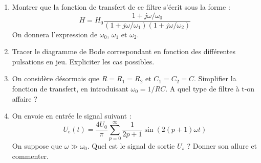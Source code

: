\begin{enumerate}

	\item Montrer que la fonction de transfert de ce filtre s'écrit sous la forme :
\begin{equation}
	H=H_0\frac{1+j\omega/\omega_0}{(1+j\omega/\omega_1)(1+j\omega/\omega_2)}
\end{equation}
On donnera l'expression de $\omega_0$, $\omega_1$ et $\omega_2$.

\item Tracer le diagramme de Bode correspondant en fonction des différentes pulsations en jeu. Expliciter les cas possibles.

\item On considère désormais que $R=R_1=R_2$ et $C_1=C_2=C$. Simplifier la fonction de transfert, en introduisant $\omega_0=1/RC$. A quel type de filtre à t-on affaire ?

\item On envoie en entrée le signal suivant :
\begin{equation}
	U_e(t) = \frac{4U_0}{\pi}\sum_{p=0}^{\infty}\frac{1}{2p+1}\sin(2(p+1)\omega t)
\end{equation}
On suppose que $\omega\gg\omega_0$. Quel est le signal de sortie $U_s$ ? Donner son allure et commenter. 

\end{enumerate}

\newpage

